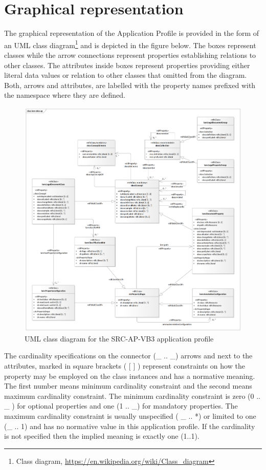 
\section{Graphical representation}
\label{ariaid-title1}

The graphical representation of the Application Profile is provided in
the form of an UML class
diagram\footnote{Class diagram,
	\url{https://en.wikipedia.org/wiki/Class_diagram}} and is depicted
in the figure below. The boxes represent classes while the arrow
connections represent properties establishing relations to other
classes. The attributes inside boxes represent properties providing
either literal data values or relation to other classes that omitted
from the diagram. Both, arrows and attributes, are labelled with the
property names prefixed with the namespace where they are defined.

\begin{figure}[!ht]
	\centering
	\includegraphics[width=\textwidth]{images/lam-skos-ap.png}
	\caption{UML class diagram for the SRC-AP-VB3 application profile}
\end{figure}

The cardinality specifications on the connector (\_ .. \_) arrows and
next to the attributes, marked in square brackets ( {[} {]} ) represent
constraints on how the property may be employed on the class instances
and has a normative meaning. The first number means minimum cardinality
constraint and the second means maximum cardinality constraint. The
minimum cardinality constraint is zero (0 .. \_ ) for optional
properties and one (1 .. \_) for mandatory properties. The maximum
cardinality constraint is usually unspecified ( \_ .. *) or limited to
one (\_ .. 1) and has no normative value in this application profile. If
the cardinality is not specified then the implied meaning is exactly one
(1..1).

